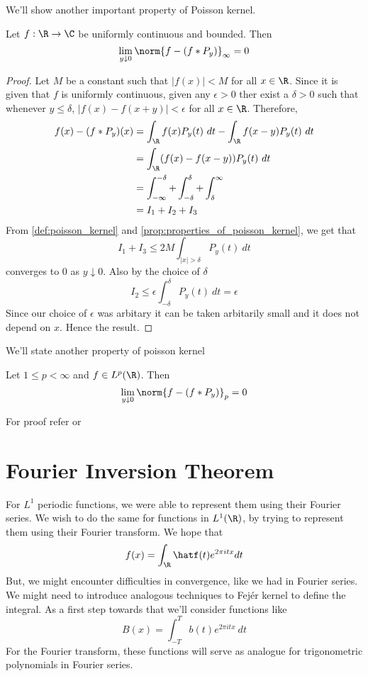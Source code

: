 We'll show another important property of Poisson kernel.
\begin{proposition}
  Let $f: \R \to \C$ be uniformly continuous and bounded. Then $$\lim_{y\downarrow 0} \norm{f - (f*P_y)}_\infty = 0$$
\end{proposition}
\begin{proof}
  Let $M$ be a constant such that $|f(x)| < M$ for all $x \in \R$. Since it is given that $f$ is uniformly continuous, given any $\epsilon>0$ ther exist a $\delta>0$ such that whenever $y \le \delta$, $|f(x) - f(x+y)| < \epsilon$ for all $x \in \R$. Therefore,
  \begin{align*}
    f(x) - (f*P_y)(x) &= \int_\R f(x)P_y(t) \ dt - \int_\R f(x-y)P_y(t) \ dt \\
    & = \int_\R (f(x) - f(x-y)) P_y(t) \ dt \\
    & = \int_{-\infty}^{-\delta} + \int_{-\delta}^{\delta} + \int_{\delta}^{\infty}\\
    & = I_1 + I_2 + I_3
  \end{align*}
  From \autoref{def:poisson_kernel} and \autoref{prop:properties_of_poisson_kernel}, we get that $$I_1+I_3 \le 2M\int_{|x|>\delta} P_y(t) \ dt$$
  converges to 0 as $y \downarrow 0$.
  Also by the choice of $\delta$ $$I_2 \le \epsilon \int_{-\delta}^{\delta} P_y(t) \ dt = \epsilon$$
  Since our choice of $\epsilon$ was arbitary it can be taken arbitarily small and it does not depend on $x$. Hence the result.
\end{proof}

We'll state another property of poisson kernel
\begin{proposition}
  Let $1\le p < \infty$ and $f \in L^p(\R)$. Then $$\lim_{y \downarrow 0}\norm{f-(f*P_y)}_p = 0$$
\end{proposition}
For proof refer \autocite[Theorem~11.74 \pno~388]{AxlerMeasure} or \autocite[Theorem~9.10 \pno~184]{papaRudin}


\section{Fourier Inversion Theorem}
For $L^1$ periodic functions, we were able to represent them using their Fourier series. We wish to do the same for functions in $L^1(\R)$, by trying to represent them using their Fourier transform. We hope that $$f(x) = \int_\R \hatf(t) e^{2\pi itx} dt$$
But, we might encounter difficulties in convergence, like we had in Fourier series. We might need to introduce analogous techniques to Fej\'er kernel to define the integral. As a first step towards that we'll consider functions like $$B(x) = \int_{-T}^T b(t)e^{2 \pi itx} \ dt$$
For the Fourier transform, these functions will serve as analogue for trigonometric polynomials in Fourier series.

